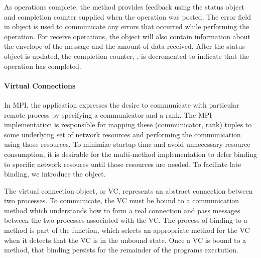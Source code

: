 As operations complete, the method provides feedback using the status object
and completion counter supplied when the operation was posted.  The error field
in  object is used to communicate any errors that occurred while
performing the operation.  For receive operations, the  object
will also contain information about the envelope of the message and the amount
of data received.  After the status object is updated, the completion counter,
, is decremented to indicate that the operation has
completed.


\paragraph{Virtual Connections}

% 
% 

In MPI, the application expresses the desire to communicate with particular
remote process by specifying a communicator and a rank.  The MPI implementation
is responsible for mapping these (communicator, rank) tuples to some underlying
set of network resources and performing the communication using those
resources.  To minimize startup time and avoid unnecessary resource
consumption, it is desirable for the multi-method implementation to defer
binding to specific network resoures until those resources are needed.  To
faciliate late binding, we introduce the  object.

The virtual connection object, or VC, represents an abstract connection between
two processes.  To communicate, the VC must be bound to a communication method
which understands how to form a real connection and pass messages between the
two processes associated with the VC.  The process of binding to a method is
part of the  function, which selects an
appropriate method for the VC when it detects that the VC is in the unbound
state.  Once a VC is bound to a method, that binding persists for the remainder
of the programs exectution.

